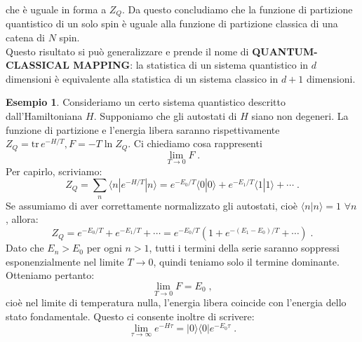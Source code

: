 \documentclass[12pt,a4paper]{article}
\theoremstyle{definition}
\newtheorem{exm}{Esempio}
\numberwithin{equation}{section}
\newcommand{\bra}{\langle}
\newcommand{\ket}{\rangle}
\newcommand{\tr}{\mathrm{tr}}
\begin{document}
che è uguale in forma a $Z_Q$. Da questo concludiamo che la funzione di partizione quantistico di un solo spin è uguale alla funzione di partizione classica di una catena di $N$ spin. \\
Questo risultato si può generalizzare e prende il nome di \textbf{QUANTUM-CLASSICAL MAPPING}: la statistica di un sistema quantistico in $d$ dimensioni è equivalente alla statistica di un sistema classico in $d+1$ dimensioni.
\begin{exm}
Consideriamo un certo sistema quantistico descritto dall'Hamiltoniana $H$. Supponiamo che gli autostati di $H$ siano non degeneri. La funzione di partizione e l'energia libera saranno rispettivamente $Z_Q=\tr\, e^{-H/T}, F=-T\ln Z_Q$. Ci chiediamo cosa rappresenti
$$
\lim_{T\to 0} F\;.
$$
Per capirlo, scriviamo:
$$
Z_Q=\sum_n \bra n|e^{-H/T}|n\ket=e^{-E_0/T}\bra 0|0\ket+ e^{-E_1/T}\bra 1|1\ket+\cdots\;.
$$
Se assumiamo di aver correttamente normalizzato gli autostati, cioè $\bra n|n\ket=1$ $\forall n$, allora:
$$
Z_Q=e^{-E_0/T}+e^{-E_1/T}+\cdots = e^{-E_0/T}\left(1+ e^{-(E_1-E_0)/T}+\cdots\right)\;.
$$
Dato che $E_n>E_0$ per ogni $n>1$, tutti i termini della serie saranno soppressi esponenzialmente nel limite $T\to 0$, quindi teniamo solo il termine dominante. Otteniamo pertanto:
\begin{equation*}
\lim_{T\to 0}F=E_0\;,
\end{equation*}
cioè nel limite di temperatura nulla, l'energia libera coincide con l'energia dello stato fondamentale. Questo ci consente inoltre di scrivere:
$$
\lim_{\tau\to\infty} e^{-H\tau}=|0\ket\bra 0|e^{-E_0\tau}\;.
$$
\end{exm}
\end{document}
